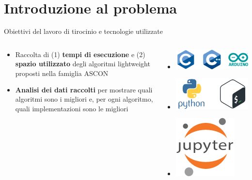 \section{Introduzione al problema}


\begin{frame}{Obiettivi del lavoro di tirocinio e tecnologie utilizzate}

\begin{columns}

\begin{column}{0.5\textwidth}

\begin{itemize}[<+->]
    \item Raccolta di (1) \textbf{tempi di esecuzione} e (2) \textbf{spazio utilizzato} degli algoritmi lightweight proposti nella famiglia ASCON
    \item \textbf{Analisi dei dati raccolti} per mostrare quali algoritmi sono i migliori e, per ogni algoritmo, quali implementazioni sono le migliori
\end{itemize}

\end{column}

\begin{column}{0.5\textwidth}
    
\begin{itemize}[<+->]
    \item[] \includegraphics[height=0.15\textwidth]{images/introduction/board.png} \vspace{0.5cm}
    \item[] \includegraphics[height=0.15\textwidth]{images/introduction/automation.png} \vspace{0.5cm}
    \item[] \includegraphics[height=0.15\textwidth]{images/introduction/plot.png}
\end{itemize}

\end{column}

\end{columns}

\end{frame}

